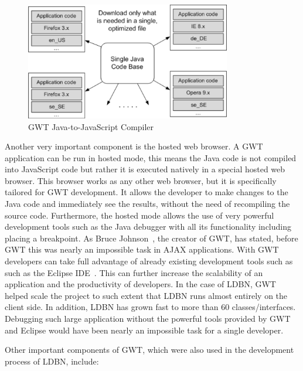 \begin{figure}[h]
	\begin{center}
		\includegraphics[width=0.8\textwidth]{./img/gwt01a.png}
		\caption{GWT Java-to-JavaScript Compiler}
		\label{fig:gwt01}
	\end{center}
\end{figure}

Another very important component is the hosted web browser. A GWT application can 
be run in hosted mode, this means 
the Java code is not compiled into JavaScript code but rather it is executed natively  
in a special hosted web browser. This browser works as any other web
browser, but it is specifically tailored for GWT development. It allows the developer
to make changes to the Java code and immediately see the results, without the need
of recompiling the source code. Furthermore, the hosted mode allows the use of 
very powerful development tools such as the Java debugger with all its functionality 
including placing a breakpoint. As Bruce Johnson~\cite{wgdd1}, 
the creator of GWT, has stated, before GWT this was nearly an impossible task in 
AJAX applications. With GWT developers can take full advantage of 
already existing development tools such as such as the Eclipse IDE~\cite{weclipse}. 
This can further increase the scalability of an application and the productivity 
of developers. 
In the case of LDBN, GWT helped scale the project to such extent that LDBN runs 
almost entirely on the client side. In addition, LDBN has grown fast to 
more than 60 classes/interfaces. Debugging such large application without the powerful 
tools provided by GWT and Eclipse would have been nearly an impossible task for 
a single developer.

Other important components of GWT, which were also used in the development 
process of LDBN, include:

